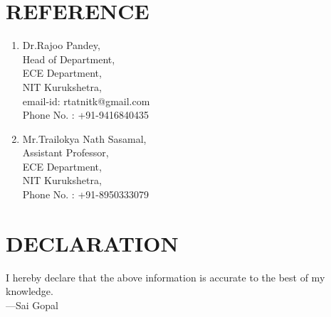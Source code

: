 \documentclass[a4paper]{article}
\begin{document}
\section*{\textbf{REFERENCE}}
\begin{enumerate}
\item Dr.Rajoo Pandey,\\
Head of Department,\\
ECE Department,\\
NIT Kurukshetra,\\
email-id: rtatnitk@gmail.com\\
Phone No. : +91-9416840435
\item Mr.Trailokya Nath Sasamal,\\
Assistant Professor,\\
ECE Department,\\
NIT Kurukshetra,\\
Phone No. : +91-8950333079
\end{enumerate}

\section*{\textbf{DECLARATION}}
I hereby declare that the above information is accurate to the best of my knowledge.\\
---Sai Gopal
\end{document}
